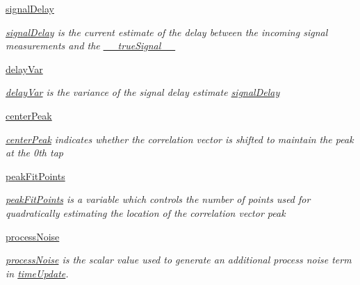 \begin{DoxyCompactItemize}
\hyperlink{classSignalCorrelationSubstate_1_1CorrelationFilter_a01e35890dee1d79bd0e4f9e82cb16e3f}{signal\+Delay}
\begin{DoxyCompactList}\small\item\em \hyperlink{classSignalCorrelationSubstate_1_1CorrelationFilter_a01e35890dee1d79bd0e4f9e82cb16e3f}{signal\+Delay} is the current estimate of the delay between the incoming signal measurements and the \hyperlink{classSignalCorrelationSubstate_1_1CorrelationFilter_a5f777d3a877658a1365ebac65b9ab25b}{\+\_\+\+\_\+true\+Signal\+\_\+\+\_\+} \end{DoxyCompactList}\item 
\hyperlink{classSignalCorrelationSubstate_1_1CorrelationFilter_a34d52beb18c131f2305689d48f612a5a}{delay\+Var}
\begin{DoxyCompactList}\small\item\em \hyperlink{classSignalCorrelationSubstate_1_1CorrelationFilter_a34d52beb18c131f2305689d48f612a5a}{delay\+Var} is the variance of the signal delay estimate \hyperlink{classSignalCorrelationSubstate_1_1CorrelationFilter_a01e35890dee1d79bd0e4f9e82cb16e3f}{signal\+Delay} \end{DoxyCompactList}\item 
\hyperlink{classSignalCorrelationSubstate_1_1CorrelationFilter_a8e53182c2ff431a6a545a265cda6ba48}{center\+Peak}
\begin{DoxyCompactList}\small\item\em \hyperlink{classSignalCorrelationSubstate_1_1CorrelationFilter_a8e53182c2ff431a6a545a265cda6ba48}{center\+Peak} indicates whether the correlation vector is shifted to maintain the peak at the 0th tap \end{DoxyCompactList}\item 
\hyperlink{classSignalCorrelationSubstate_1_1CorrelationFilter_a85a73739e9bb0a7f20886a812a3afa83}{peak\+Fit\+Points}
\begin{DoxyCompactList}\small\item\em \hyperlink{classSignalCorrelationSubstate_1_1CorrelationFilter_a85a73739e9bb0a7f20886a812a3afa83}{peak\+Fit\+Points} is a variable which controls the number of points used for quadratically estimating the location of the correlation vector peak \end{DoxyCompactList}\item 
\hyperlink{classSignalCorrelationSubstate_1_1CorrelationFilter_abbd9598dd2d237abb1eef86ba427da7f}{process\+Noise}
\begin{DoxyCompactList}\small\item\em \hyperlink{classSignalCorrelationSubstate_1_1CorrelationFilter_abbd9598dd2d237abb1eef86ba427da7f}{process\+Noise} is the scalar value used to generate an additional process noise term in \hyperlink{classSignalCorrelationSubstate_1_1CorrelationFilter_a07a8c37a30c3d0a057049e0ff2eac67f}{time\+Update}. \end{DoxyCompactList}\item 

\end{DoxyCompactItemize}
